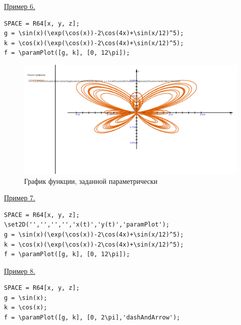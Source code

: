 \eject
\underline{Пример 6. }


\vspace*{-2mm}
\begin{verbatim}
SPACE = R64[x, y, z];
g = \sin(x)(\exp(\cos(x))-2\cos(4x)+\sin(x/12)^5);
k = \cos(x)(\exp(\cos(x))-2\cos(4x)+\sin(x/12)^5);
f = \paramPlot([g, k], [0, 12\pi]);
\end{verbatim}
\vspace*{-2mm}


\begin{figure}[h!]
 \includegraphics[scale=0.3]{pictures/2_6}
\vspace*{-10mm}
\caption{График функции, заданной параметрически}
\label{2_6}
\end{figure}
 

\eject
\underline{Пример 7. }


\vspace*{-2mm}
\begin{verbatim}
SPACE = R64[x, y, z];
\set2D('','','','','x(t)','y(t)','paramPlot');
g = \sin(x)(\exp(\cos(x))-2\cos(4x)+\sin(x/12)^5);
k = \cos(x)(\exp(\cos(x))-2\cos(4x)+\sin(x/12)^5);
f = \paramPlot([g, k], [0, 12\pi]);
\end{verbatim}
\vspace*{-2mm}

\eject
\underline{Пример 8. }

\vspace*{-2mm}
\begin{verbatim}
SPACE = R64[x, y, z];
g = \sin(x); 
k = \cos(x); 
f = \paramPlot([g, k], [0, 2\pi],'dashAndArrow');
\end{verbatim}
\vspace*{-2mm}


